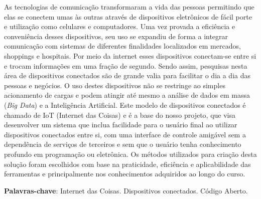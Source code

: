 \documentclass[../../layout.tex]{subfiles}
\begin{document}
\begin{resumo}
\hspace*{3em}As tecnologias de comunicação transformaram a vida das pessoas permitindo que elas se conectem umas às outras através de dispositivos eletrônicos de fácil porte e utilização como celulares e computadores.
Uma vez provada a eficiência e conveniência desses dispositivos, seu uso se expandiu de forma a integrar comunicação com sistemas de diferentes finalidades localizados em mercados, shoppings e hospitais.
Por meio da internet esses dispositivos conectam-se entre si e trocam informações em uma fração de segundo.
Sendo assim, pesquisas nesta área de dispositivos conectados são de grande valia para facilitar o dia a dia das pessoas e negócios.
O uso destes dispositivos não se restringe ao simples acionamento de cargas e podem atingir até mesmo a análise de dados em massa (\emph{Big Data}) e a Inteligência Artificial.
Este modelo de dispositivos conectados é chamado de IoT (Internet das Coisas) e é a base do nosso projeto, que visa desenvolver um sistema que inclua facilidade para o usuário final ao utilizar dispositivos conectados entre si, com uma interface de controle amigável sem a dependência de serviços de terceiros e sem que o usuário tenha conhecimento profundo em programação ou eletrônica.
Os métodos utilizados para criação desta solução foram escolhidos com base na praticidade, eficiência e aplicabilidade das ferramentas e principalmente nos conhecimentos adquiridos ao longo do curso.
\vspace{\onelineskip}

\noindent
\textbf{Palavras-chave}: Internet das Coisas. Dispositivos conectados. Código Aberto.
\end{resumo}
\end{document}
